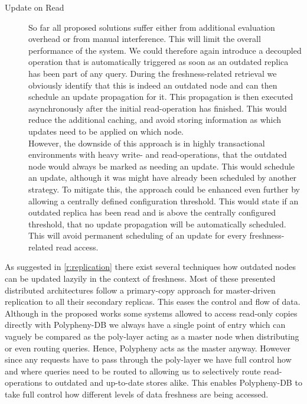 \begin{description}
    \item[Update on Read] So far all proposed solutions suffer either from additional evaluation overhead or from manual interference. This will limit the overall 
    performance of the system. We could therefore again introduce a decoupled operation that is automatically triggered as soon as an outdated replica has been part of any query. 
    During the freshness-related retrieval we obviously identify that this is indeed an outdated node and can then schedule an update propagation for it. This propagation is then
    executed asynchronously after the initial read-operation has finished. This would reduce the additional caching, and avoid storing 
    information as which updates need to be applied on which node.\\
    However, the downside of this approach is in highly transactional environments with heavy write- and read-operations, that the outdated node would always be marked as 
    needing an update. This would schedule an update, although it was might have already been scheduled by another strategy. 
    To mitigate this, the approach could be enhanced even further by allowing a centrally defined configuration threshold. This would state if an outdated replica has been read
    and is above the centrally configured threshold, that no update propagation will be automatically scheduled.
    This will avoid permanent scheduling of an update for every freshness-related read access.

\end{description}




As suggested in \ref{r:replication} there exist several techniques how outdated nodes can be updated lazyily in the context of freshness.
Most of these presented distributed architectures follow a primary-copy approach for master-driven replication to all their secondary replicas.
This eases the control and flow of data. Although in the proposed works some systems allowed to access read-only copies directly
with Polypheny-DB we always have a single point of entry which can vaguely be compared as the poly-layer acting as a master node
when distributing or even routing queries. Hence, Polypheny acts as the master anyway. However since any requests have to pass through the poly-layer
we have full control how and where queries need to be routed to allowing us to selectively route read-operations to outdated and up-to-date stores alike.
This enables Polypheny-DB to take full control how different levels of data freshness are being accessed.

